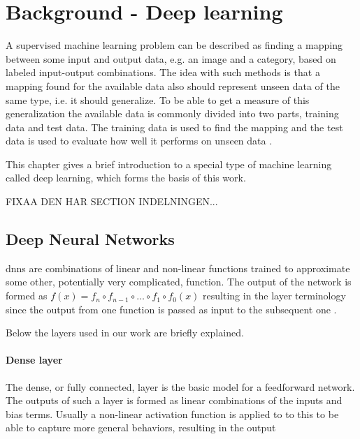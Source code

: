 \chapter{Background - Deep learning}

A supervised machine learning problem can be described as finding a mapping between some input and output data, e.g. an image and a category, based on labeled input-output combinations. The idea with such methods is that a mapping found for the available data also should represent unseen data of the same type, i.e. it should generalize. To be able to get a measure of this generalization the available data is commonly divided into two parts, training data and test data. The training data is used to find the mapping and the test data is used to evaluate how well it performs on unseen data \cite{Bishop2006}.

This chapter gives a brief introduction to a special type of machine learning called deep learning, which forms the basis of this work.

FIXAA DEN HAR SECTION INDELNINGEN...
\section{Deep Neural Networks}
\glspl{dnn} are combinations of linear and non-linear functions trained to approximate some other, potentially very complicated, function. The output of the network is formed as $f(x) = f_n \circ f_{n-1} \circ \hdots \circ f_1 \circ f_0(x)$ resulting in the layer terminology since the output from one function is passed as input to the subsequent one \cite{Goodfellow2016}.

Below the layers used in our work are briefly explained.

\subsubsection{Dense layer}
The dense, or fully connected, layer is the basic model for a feedforward network. The outputs of such a layer is formed as linear combinations of the inputs and bias terms. Usually a non-linear activation function is applied to to this to be able to capture more general behaviors, resulting in the output

